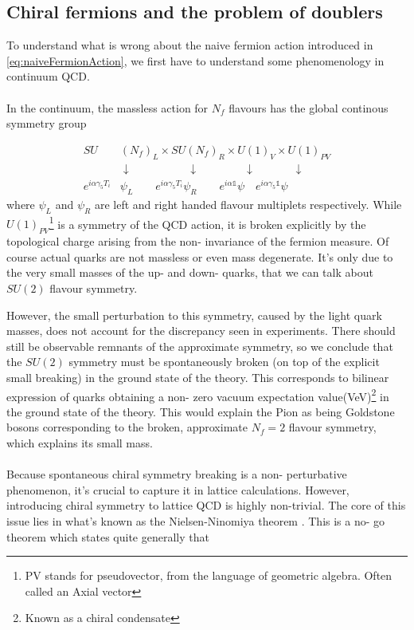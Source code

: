 \documentclass[a4paper,10pt]{book}
\begin{document}
\subsection{Chiral fermions and the problem of doublers}\label{Chiral_symmetry_breaking}
To understand what is wrong about the naive fermion action introduced in \eqref{eq:naiveFermionAction}, we first have to understand some phenomenology in continuum QCD.\\\\In the continuum, the massless action for $N_f$ flavours has the global continous symmetry group

\begin{equation}\label{eq:SU_SU_U_U}
\begin{aligned} 
SU&(N_f)_L\times SU (N_f)_R\times U(1)_V \times U(1)_{PV}\\ &\downarrow \quad\quad\quad\quad\quad \downarrow\quad\quad\quad\quad \downarrow\quad\quad\quad \,\,\downarrow\\
e^{i\alpha\gamma_5T_i}&\psi_L\quad \quad e^{i\alpha\gamma_5T_i}\psi_R\quad \quad e^{i\alpha\mathbb{1}}\psi\quad e^{i\alpha\gamma_5\mathbb{1}}\psi
\end{aligned}
\end{equation}
where $\psi_L$ and $\psi_R$ are left and right handed flavour multiplets respectively. While $U(1)_{PV}$\footnote{PV stands for pseudovector, from the language of geometric algebra. Often called an Axial vector} is a symmetry of the QCD action, it is broken explicitly by the topological charge arising from the non- invariance of the fermion measure. Of course actual quarks are not massless or even mass degenerate. It's only due to the very small masses of the up- and down- quarks, that we can talk about $SU(2)$ flavour symmetry.\par However, the small perturbation to this symmetry, caused by the light quark masses, does not account for the discrepancy seen in experiments. There should still be observable remnants of the approximate symmetry, so we conclude that the $SU(2)$ symmetry must be spontaneously broken (on top of the explicit small breaking) in the ground state of the theory. This corresponds to bilinear expression of quarks obtaining a non- zero vacuum expectation value(VeV)\footnote{Known as a chiral condensate} in the ground state of the theory. This would explain the Pion as being Goldstone bosons corresponding to the broken, approximate $N_f=2$ flavour symmetry, which explains its small mass.\\\\Because spontaneous chiral symmetry breaking is a non- perturbative phenomenon, it's crucial to capture it in lattice calculations. However, introducing chiral symmetry to lattice QCD is highly non-trivial. The core of this issue lies in what's known as the Nielsen-Ninomiya theorem \cite{NielsenH.B1981Antf}. This is a no- go theorem which states quite generally that
\end{document}
